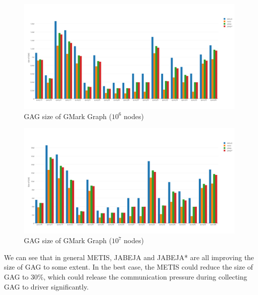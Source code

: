 \begin{figure}[h!]
  \caption{GAG size of GMark Graph ($10^6$ nodes)}
  \label{fig:gmark-1m-gag}
  \centering
    \includegraphics[width=1.0\textwidth]{img/gmark-1m-gag}
\end{figure}
\begin{figure}[h!]
  \caption{GAG size of GMark Graph ($10^7$ nodes)}
  \label{fig:gmark-10m-gag}
  \centering
    \includegraphics[width=1.0\textwidth]{img/gmark-10m-gag}
\end{figure}
We can see that in general METIS, JABEJA and JABEJA* are all improving the size of GAG to some extent. In the best case, the METIS could reduce the size of GAG to $30\%$, which could release the communication pressure during collecting GAG to driver significantly.

